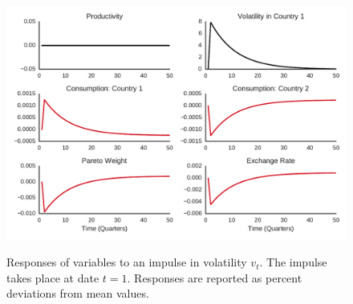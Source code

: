 %
\clearpage
\begin{figure}[htb]
\caption{Responses of variables
to an impulse in volatility $v_t$.
The impulse takes place at date $t=1$.
Responses are reported as percent deviations from mean values.
}

\bigskip
\includegraphics[width=\textwidth]{images/BCFL/irf_wrt_v_alpha9.pdf}
\label{fig:irf-v}
\end{figure}
